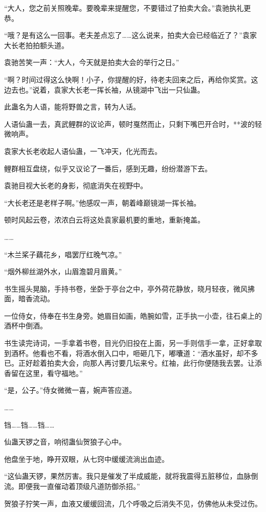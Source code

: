 \begin{this_body}
“大人，您之前关照晚辈。要晚辈来提醒您，不要错过了拍卖大会。”袁驰执礼更恭。

“哦？是有这么一回事。老夫差点忘了……这么说来，拍卖大会已经临近了？”袁家大长老拍拍额头道。

袁驰苦笑一声：“大人，今天就是拍卖大会的举行之日。”

“啊？时间过得这么快啊！小子，你提醒的好，待老夫回来之后，再给你奖赏。这边去也。”说着，袁家大长老一挥长袖，从镜湖中飞出一只仙蛊。

此蛊名为人语，能将野兽之言，转为人话。

人语仙蛊一去，真武鲤群的议论声，顿时戛然而止，只剩下嘴巴开合时，**波的轻微响声。

袁家大长老收起人语仙蛊，一飞冲天，化光而去。

鲤群相互盘绕，似乎又议论了一番后，感到无趣，纷纷潜游下去。

袁驰目视大长老的身影，彻底消失在视野中。

“大长老还是老样子啊。”他感叹一声，朝着峰巅镜湖一挥长袖。

顿时风起云卷，浓浓白云将这处袁家最机要的重地，重新掩盖。

……

“木兰桨子藕花乡，唱罢厅红晚气凉。”

“烟外柳丝湖外水，山眉澹碧月眉黄。”

书生摇头晃脑，手持书卷，坐卧于亭台之中，亭外荷花静放，晓月轻夜，微风拂面，暗香流动。

一位侍女，侍奉在书生身旁。她眉目如画，皓腕如雪，正手执一小壶，往石桌上的酒杯中倒酒。

书生读完诗词，一手拿着书卷，目光仍旧投在上面，另一手则信手一拿，正好拿取到酒杯。他看也不看，将酒水倒入口中，咂砸几下，嘟囔道：“酒水虽好，却不多已。正好趁着拍卖大会，向那人再讨要几坛来兮。红袖，此行你便随我去罢。让添香留在这里，看守福地。”

“是，公子。”侍女微微一喜，婉声答应道。

……

铛……铛……铛……

仙蛊天锣之音，响彻蛊仙贺狼子心中。

他盘坐于地，睁开双眼，从七窍中缓缓流淌出血迹。

“这仙蛊天锣，果然厉害。我只是催发了半成威能，就将我震得五脏移位，血脉倒流。即便我一直催动着顶级凡道防御杀招。”

贺狼子狞笑一声，血液又缓缓回流，几个呼吸之后消失不见，仿佛他从未受过伤。


\end{this_body}

